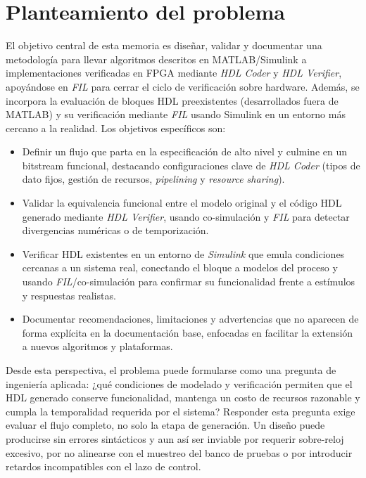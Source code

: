 \section{Planteamiento del problema}

El objetivo central de esta memoria es diseñar, validar y documentar una metodología para llevar algoritmos descritos en MATLAB/Simulink a implementaciones verificadas en FPGA mediante \textit{HDL Coder} y \textit{HDL Verifier}, apoyándose en \textit{FIL} para cerrar el ciclo de verificación sobre hardware. Además, se incorpora la evaluación de bloques HDL preexistentes (desarrollados fuera de MATLAB) y su verificación mediante \textit{FIL} usando Simulink en un entorno más cercano a la realidad. Los objetivos específicos son:

\begin{itemize}
    \item Definir un flujo que parta en la especificación de alto nivel y culmine en un bitstream funcional, destacando configuraciones clave de \textit{HDL Coder} (tipos de dato fijos, gestión de recursos, \textit{pipelining} y \textit{resource sharing}).
    \item Validar la equivalencia funcional entre el modelo original y el código HDL generado mediante \textit{HDL Verifier}, usando co-simulación y \textit{FIL} para detectar divergencias numéricas o de temporización.
    \item Verificar HDL existentes en un entorno de \textit{Simulink} que emula condiciones cercanas a un sistema real, conectando el bloque a modelos del proceso y usando \textit{FIL}/co-simulación para confirmar su funcionalidad frente a estímulos y respuestas realistas.
    \item Documentar recomendaciones, limitaciones y advertencias que no aparecen de forma explícita en la documentación base, enfocadas en facilitar la extensión a nuevos algoritmos y plataformas.
\end{itemize}

Desde esta perspectiva, el problema puede formularse como una pregunta de ingeniería aplicada: ¿qué condiciones de modelado y verificación permiten que el HDL generado conserve funcionalidad, mantenga un costo de recursos razonable y cumpla la temporalidad requerida por el sistema? Responder esta pregunta exige evaluar el flujo completo, no solo la etapa de generación. Un diseño puede producirse sin errores sintácticos y aun así ser inviable por requerir sobre-reloj excesivo, por no alinearse con el muestreo del banco de pruebas o por introducir retardos incompatibles con el lazo de control.

